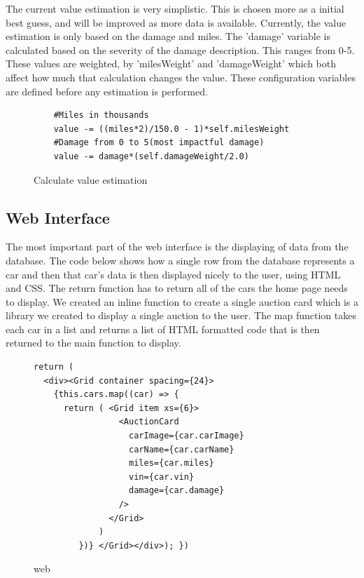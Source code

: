 \documentclass[onecolumn, draftclsnofoot,10pt, compsoc]{IEEEtran}
\begin{document}
The current value estimation is very simplistic. This is chosen more as a initial best guess, and will be improved as more data is available. Currently, the value estimation is only based on the damage and miles. The 'damage' variable is calculated based on the severity of the damage description. This ranges from 0-5. These values are weighted, by 'milesWeight' and 'damageWeight' which both affect how much that calculation changes the value. These configuration variables are defined before any estimation is performed. 

\begin{figure}[H]
\centering
\begin{verbatim}
    #Miles in thousands
    value -= ((miles*2)/150.0 - 1)*self.milesWeight
    #Damage from 0 to 5(most impactful damage) 
    value -= damage*(self.damageWeight/2.0)
\end{verbatim}
\caption{Calculate value estimation}
\end{figure}

\subsection{Web Interface}
The most important part of the web interface is the displaying of data from the database. The code below shows how a single row from the database represents a car and then that car's data is then displayed nicely to the user, using HTML and CSS. The return function has to return all of the cars the home page needs to display. We created an inline function to create a single auction card which is a library we created to display a single auction to the user. The map function takes each car in a list and returns a list of HTML formatted code that is then returned to the main function to display. 

\begin{figure}[H]
\begin{verbatim}
return ( 
  <div><Grid container spacing={24}>
    {this.cars.map((car) => {
      return ( <Grid item xs={6}>
                 <AuctionCard
                   carImage={car.carImage}
                   carName={car.carName}
                   miles={car.miles}
                   vin={car.vin}
                   damage={car.damage}
                 />
               </Grid>
             )
         })} </Grid></div>); })
\end{verbatim}
\caption{web}
\end{figure}




\end{document}
